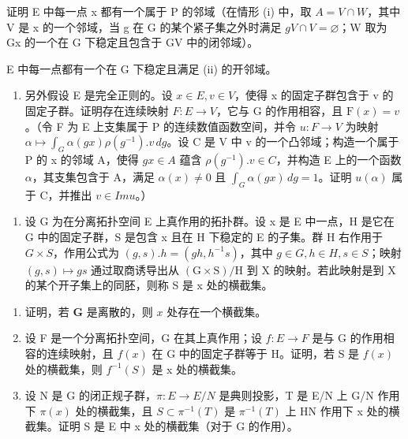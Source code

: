 证明 E 中每一点 x 都有一个属于 P 的邻域（在情形 (i) 中，取 \(A = V \cap W\)，其中 V 是 x 的一个邻域，当 g 在 G 的某个紧子集之外时满足 \(gV \cap V = \varnothing\)；W 取为 Gx 的一个在 G 下稳定且包含于 GV 中的闭邻域）。

E 中每一点都有一个在 G 下稳定且满足 (ii) 的开邻域。

\begin{enumerate}
\def\labelenumi{\alph{enumi})}
\setcounter{enumi}{2}
\tightlist
\item
  另外假设 E 是完全正则的。设 \(x \in E, v \in V\)，使得 x 的固定子群包含于 v 的固定子群。证明存在连续映射 \(F : E \to V\)，它与 G 的作用相容，且 \(\mathrm{F}(x) = v\)。（令 F 为 E 上支集属于 P 的连续数值函数空间，并令 \(u : F \to V\) 为映射 \(\alpha \mapsto \int_{G} \alpha(gx) \rho(g^{-1}). v \, dg\)。设 C 是 V 中 v 的一个凸邻域；构造一个属于 P 的 x 的邻域 A，使得 \(gx \in A\) 蕴含 \(\rho(g^{-1}). v \in C\)，并构造 E 上的一个函数 \(\alpha\)，其支集包含于 A，满足 \(\alpha(x) \neq 0\) 且 \(\int_{G} \alpha(gx) \, dg = 1\)。证明 \(u(\alpha)\) 属于 C，并推出 \(v \in Im u\)。）
\end{enumerate}

\begin{enumerate}
\def\labelenumi{\arabic{enumi})}
\setcounter{enumi}{15}
\tightlist
\item
  设 G 为在分离拓扑空间 E 上真作用的拓扑群。设 x 是 E 中一点，H 是它在 G 中的固定子群，S 是包含 x 且在 H 下稳定的 E 的子集。群 H 右作用于 \(G \times S\)，作用公式为 \((g, s).h = (gh, h^{-1}s)\)，其中 \(g \in G, h \in H, s \in S\)；映射 \((g, s) \mapsto gs\) 通过取商诱导出从 \((\mathrm{G} \times \mathrm{S})/\mathrm{H}\) 到 X 的映射。若此映射是到 X 的某个开子集上的同胚，则称 S 是 x 处的横截集。
\end{enumerate}

\begin{enumerate}
\def\labelenumi{\alph{enumi})}
\item
  证明，若 \(\mathbf{G}\) 是离散的，则 \(x\) 处存在一个横截集。
\item
  设 F 是一个分离拓扑空间，G 在其上真作用；设 \(f : E \to F\) 是与 G 的作用相容的连续映射，且 \(f(x)\) 在 G 中的固定子群等于 H。证明，若 S 是 \(f(x)\) 处的横截集，则 \(f^{-1}(S)\) 是 x 处的横截集。
\item
  设 N 是 G 的闭正规子群，\(\pi: E \to E/N\) 是典则投影，T 是 E/N 上 G/N 作用下 \(\pi(x)\) 处的横截集，且 \(S \subset \pi^{-1}(T)\) 是 \(\pi^{-1}(T)\) 上 HN 作用下 x 处的横截集。证明 S 是 E 中 x 处的横截集（对于 G 的作用）。
\end{enumerate}

